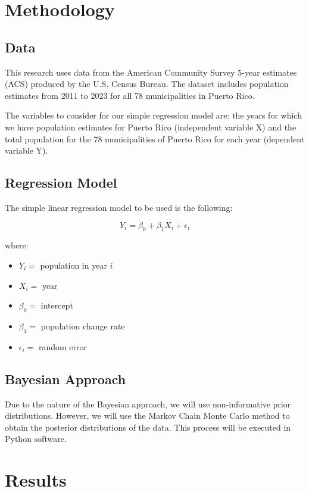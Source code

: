 \documentclass{article}
\begin{document}
\section{Methodology}
\subsection{Data}
This research uses data from the American Community Survey 5-year estimates (ACS)
produced by the U.S. Census Bureau. The dataset includes population estimates from
2011 to 2023 for all 78 municipalities in Puerto Rico.

The variables to consider for our simple regression model are: the years for which we have population estimates for Puerto Rico (independent variable X) and the total population for the 78 municipalities of Puerto Rico for each year (dependent variable Y).

\subsection{Regression Model}

The simple linear regression model to be used is the following:

\[
	Y_i = \beta_0 + \beta_1 X_i + \epsilon_i
\]

where:
\begin{itemize}
	\item $Y_i = $ population in year $i$
	\item $X_i = $ year
	\item $\beta_0 = $ intercept
	\item $\beta_1 = $ population change rate
	\item $\epsilon_i = $ random error
\end{itemize}

\subsection{Bayesian Approach}

Due to the nature of the Bayesian approach, we will use non-informative prior distributions. However, we will use the Markov Chain Monte Carlo method to obtain the posterior distributions of the data. This process will be executed in Python software.


\section{Results}
\end{document}
